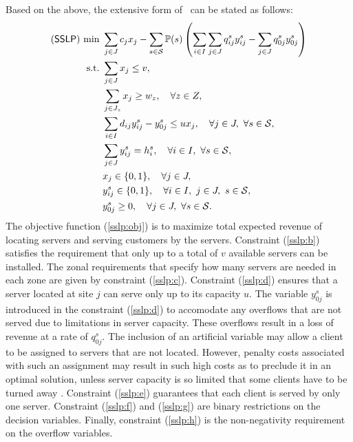 Based on the above, the extensive form of \sslp\ can be stated as follows:
\begin{subequations} \label{sslp:formulation}
	\begin{align}
	(\sslp)\ \textrm{min}\ &	\sum_{j\in J}c_j x_j - \sum_{s\in\mathcal{S}}\PP(s)\left(\sum_{i\in I}\sum_{j\in J}q_{ij}^s y_{ij}^s - \sum_{j\in J}q_{0j}^s y_{0j}^s \right) \label{sslp:obj} \\ 
	\textrm{s.t.}\ &\sum_{j\in J}x_j\le v,\label{sslp:b}\\ 
	&\sum_{j\in J_z}x_j\ge w_z,\quad\forall z\in Z,\label{sslp:c}\\
	&\sum_{i\in I}d_{ij}y_{ij}^s - y_{0j}^s\le ux_j,\quad\forall j\in J,\ \forall s\in\mathcal{S}, \label{sslp:d} \\
	&\sum_{j\in J}y_{ij}^s=h_i^s,\quad\forall i\in I,\ \forall s\in \mathcal{S}, \label{sslp:e}\\
	&x_j\in\{0,1\},\quad\forall j\in J,\label{sslp:f}\\
	&y_{ij}^s\in\{0,1\},\quad\forall i\in I,\ j\in J,\ s\in\mathcal{S}, \label{sslp:g}\\
	&y_{0j}^s\ge 0,\quad\forall j\in J,\ \forall s\in\mathcal{S} \label{sslp:h}.
	\end{align}
\end{subequations}
The objective function (\ref{sslp:obj}) is to maximize total expected revenue of locating servers and serving customers by the servers. Constraint (\ref{sslp:b}) satisfies the requirement that only up to a total of $v$ available servers can be installed. The zonal requirements that specify how many servers are needed in each zone are given by constraint (\ref{sslp:c}). Constraint (\ref{sslp:d}) ensures that a server located at site $j$ can serve only up to its capacity $u$. The variable $y_{0j}^s$ is introduced in the constraint (\ref{sslp:d}) to accomodate any overflows that are not served due to limitations in server capacity. These overflows result in a loss of revenue at a rate of $q_{0j}^s$. The inclusion of an artificial variable may allow a client to be assigned to servers that are not located. However, penalty costs associated with such an assignment may result in such high costs as to preclude it in an optimal solution, unless server capacity is so limited that some clients have to be turned away \cite{journal:NS2005}. Constraint (\ref{sslp:e}) guarantees that each client is served by only one server. Constraint (\ref{sslp:f}) and (\ref{sslp:g}) are binary restrictions on the decision variables. Finally, constraint (\ref{sslp:h}) is the non-negativity requirement on the overflow variables.

